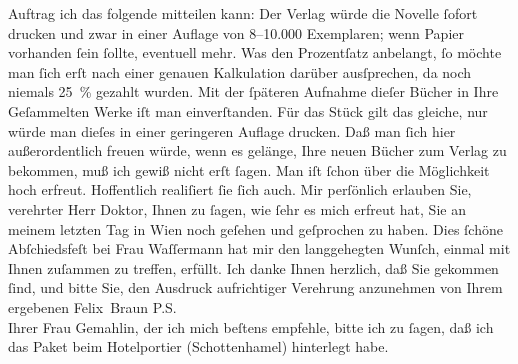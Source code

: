 \begin{ledgroupsized}[t]{13cm}
               Auftrag ich das folgende mitteilen kann:\pend
           \pstart
           Der Verlag würde die Novelle ſofort drucken und zwar
               in einer Auflage von 8–10.000 Exemplaren; wenn Papier vorhanden ſein ſollte,
               eventuell mehr. Was den Prozentſatz anbelangt, ſo möchte man ſich erſt nach einer
               genauen Kalkulation darüber ausſprechen, da noch niemals 25 {\%}
               gezahlt wurden. Mit der ſpäteren Aufnahme dieſer Bücher in Ihre Geſammelten Werke iſt man einverſtanden. Für das Stück gilt das gleiche, nur
               würde man dieſes in einer geringeren Auflage drucken.\pend
           \pstart
           Daß man ſich hier außerordentlich freuen würde, wenn es gelänge, Ihre neuen Bücher
               zum Verlag zu bekommen, muß ich
               gewiß nicht erſt ſagen. Man iſt ſchon über die Möglichkeit hoch erfreut. Hoffentlich
               realiſiert ſie ſich auch.\pend
           \pstart
           {\pb}Mir perſönlich erlauben Sie, verehrter Herr Doktor,
               Ihnen zu ſagen, wie ſehr es mich erfreut hat, Sie an meinem letzten Tag in Wien noch geſehen und geſprochen zu haben. Dies
               ſchöne Abſchiedsfeſt bei Frau Waſſermann hat
               mir den langgehegten Wunſch, einmal mit Ihnen zuſammen zu treffen, erfüllt. Ich danke
               Ihnen herzlich, daß Sie gekommen ſind, und bitte Sie, den Ausdruck aufrichtiger
               Verehrung anzunehmen von Ihrem ergebenen\pend
           \pstart \spacefill\mbox{Felix Braun}\pend{}\pstart
           \noindent{}P.S.{\\}Ihrer Frau
                     Gemahlin, der ich mich beſtens empfehle, bitte ich zu ſagen, daß ich das
                  Paket beim Hotelportier (Schottenhamel)
                  hinterlegt habe.\pend
           
         
         \endnumbering{}\end{ledgroupsized}  \newcommand{\dateiname}{L02285}\newcommand{\titel}{Felix Braun an Arthur Schnitzler, 21. 4. 1918}\newcommand{\editorInnen}{Martin Anton Müller und Gerd-Hermann Susen}
      